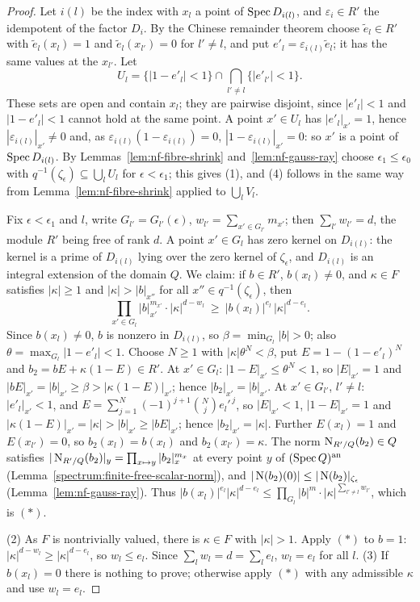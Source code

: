 \begin{proof}
Let $i(l)$ be the index with $x_l$ a point of $\operatorname{Spec} D_{i(l)}$, and $\varepsilon_i\in R'$ the idempotent of the factor
$D_i$. By the Chinese remainder theorem choose $\tilde e_l\in R'$ with $\tilde e_l(x_l)=1$ and $\tilde e_l(x_{l'})=0$ for
$l'\ne l$, and put $e'_l=\varepsilon_{i(l)}\tilde e_l$; it has the same values at the $x_{l'}$. Let
\[
U_l=\{|1-e'_l|<1\}\cap\bigcap_{l'\ne l}\{|e'_{l'}|<1\}.
\]
These sets are open and contain $x_l$; they are pairwise disjoint, since $|e'_l|<1$ and $|1-e'_l|<1$ cannot hold at
the same point. A point $x'\in U_l$ has $|e'_l|_{x'}=1$, hence $|\varepsilon_{i(l)}|_{x'}\ne0$ and, as
$\varepsilon_{i(l)}(1-\varepsilon_{i(l)})=0$, $|1-\varepsilon_{i(l)}|_{x'}=0$: so $x'$ is a point of $\operatorname{Spec} D_{i(l)}$. By
Lemmas~\ref{lem:nf-fibre-shrink} and~\ref{lem:nf-gauss-ray} choose $\epsilon_1\le\epsilon_0$ with
$q^{-1}(\zeta_\epsilon)\subseteq\bigcup_lU_l$ for $\epsilon<\epsilon_1$; this gives (1), and (4) follows in the same way
from Lemma~\ref{lem:nf-fibre-shrink} applied to $\bigcup_lV_l$.

Fix $\epsilon<\epsilon_1$ and $l$, write $G_{l'}=G_{l'}(\epsilon)$, $w_{l'}=\sum_{x'\in G_{l'}}m_{x'}$; then
$\sum_{l'}w_{l'}=d$, the module $R'$ being free of rank $d$. A point $x'\in G_l$ has zero kernel on $D_{i(l)}$: the
kernel is a prime of $D_{i(l)}$ lying over the zero kernel of $\zeta_\epsilon$, and $D_{i(l)}$ is an integral extension
of the domain $Q$. We claim: if $b\in R'$, $b(x_l)\ne0$, and $\kappa\in F$ satisfies $|\kappa|\ge1$ and
$|\kappa|>|b|_{x''}$ for all $x''\in q^{-1}(\zeta_\epsilon)$, then
\[
\prod_{x'\in G_l}|b|_{x'}^{m_{x'}}\cdot|\kappa|^{d-w_l}\ \ge\ |b(x_l)|^{e_l}\,|\kappa|^{d-e_l}. \tag{$\ast$}
\]
Since $b(x_l)\ne0$, $b$ is nonzero in $D_{i(l)}$, so $\beta=\min_{G_l}|b|>0$; also $\theta=\max_{G_l}|1-e'_l|<1$.
Choose $N\ge1$ with $|\kappa|\theta^N<\beta$, put $E=1-(1-e'_l)^N$ and $b_2=bE+\kappa(1-E)\in R'$. At $x'\in G_l$:
$|1-E|_{x'}\le\theta^N<1$, so $|E|_{x'}=1$ and $|bE|_{x'}=|b|_{x'}\ge\beta>|\kappa(1-E)|_{x'}$; hence
$|b_2|_{x'}=|b|_{x'}$. At $x'\in G_{l'}$, $l'\ne l$: $|e'_l|_{x'}<1$, and $E=\sum_{j=1}^N(-1)^{j+1}\binom Nje_l'^{\,j}$, so
$|E|_{x'}<1$, $|1-E|_{x'}=1$ and $|\kappa(1-E)|_{x'}=|\kappa|>|b|_{x'}\ge|bE|_{x'}$; hence $|b_2|_{x'}=|\kappa|$. Further
$E(x_l)=1$ and $E(x_{l'})=0$, so $b_2(x_l)=b(x_l)$ and $b_2(x_{l'})=\kappa$. The norm $\operatorname{N}_{R'/Q}(b_2)\in Q$ satisfies
$|\operatorname{N}_{R'/Q}(b_2)|_y=\prod_{x\mapsto y}|b_2|_x^{m_x}$ at every point $y$ of $(\operatorname{Spec} Q)^{\mathrm{an}}$
(Lemma~\ref{spectrum:finite-free-scalar-norm}), and $|\operatorname{N}(b_2)(0)|\le|\operatorname{N}(b_2)|_{\zeta_\epsilon}$
(Lemma~\ref{lem:nf-gauss-ray}). Thus
$|b(x_l)|^{e_l}|\kappa|^{d-e_l}\le\prod_{G_l}|b|^{m}\cdot|\kappa|^{\sum_{l'\ne l}w_{l'}}$, which is $(\ast)$.

(2) As $F$ is nontrivially valued, there is $\kappa\in F$ with $|\kappa|>1$. Apply $(\ast)$ to $b=1$: $|\kappa|^{d-w_l}\ge|\kappa|^{d-e_l}$, so
$w_l\le e_l$. Since $\sum_lw_l=d=\sum_le_l$, $w_l=e_l$ for all $l$. (3) If $b(x_l)=0$ there is nothing to prove;
otherwise apply $(\ast)$ with any admissible $\kappa$ and use $w_l=e_l$.
\end{proof}

